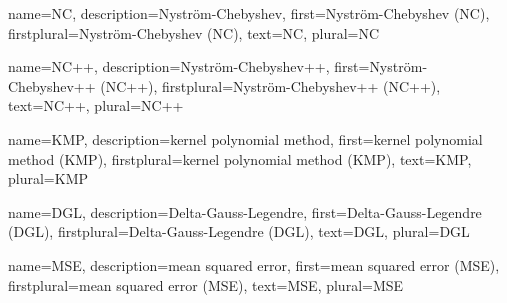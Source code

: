 {%
  name={NC},%
  description={Nystr\"om-Chebyshev},%
  first={Nystr\"om-Chebyshev (NC)},%
  firstplural={Nystr\"om-Chebyshev (NC)},%
  text={NC},%
  plural={NC}%
}

{%
  name={NC++},%
  description={Nystr\"om-Chebyshev++},%
  first={Nystr\"om-Chebyshev++ (NC++)},%
  firstplural={Nystr\"om-Chebyshev++ (NC++)},%
  text={NC++},%
  plural={NC++}%
}

{%
  name={KMP},%
  description={kernel polynomial method},%
  first={kernel polynomial method (KMP)},%
  firstplural={kernel polynomial method (KMP)},%
  text={KMP},%
  plural={KMP}%
}

{%
  name={DGL},%
  description={Delta-Gauss-Legendre},%
  first={Delta-Gauss-Legendre (DGL)},%
  firstplural={Delta-Gauss-Legendre (DGL)},%
  text={DGL},%
  plural={DGL}%
}

{%
  name={MSE},%
  description={mean squared error},%
  first={mean squared error (MSE)},%
  firstplural={mean squared error (MSE)},%
  text={MSE},%
  plural={MSE}%
}
